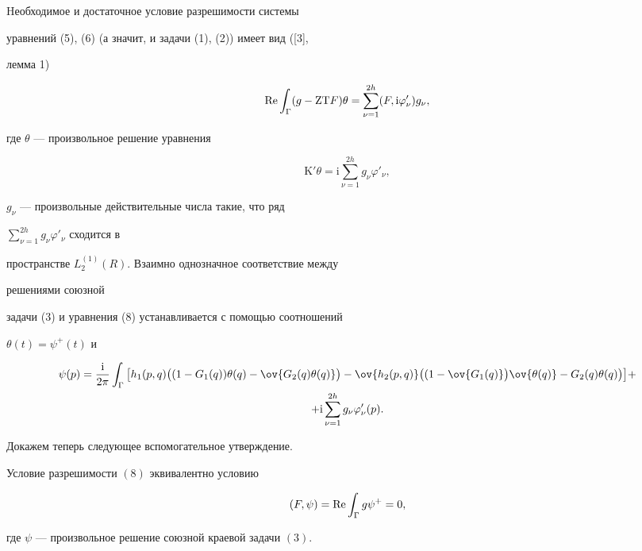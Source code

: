 Hеобходимое и достаточное условие разрешимости системы 


уравнений (5), (6) (а значит, и задачи (1), (2)) имеет вид ([3], 


лемма 1) 


\begin{equation} 


\re\int_\Gamma(g-{\mathrm Z}{\mathrm T}F)\theta= 


\sum^{2h}_{\nu=1}(F,{\mathrm i}\varphi'_\nu)g_\nu, 


\end{equation} 


где $\theta$ --- произвольное решение уравнения 


\begin{equation} 


{\mathrm K}'\theta={\mathrm i}\sum^{2h}_{\nu=1}g_\nu\varphi'_\nu, 


\end{equation} 


$g_\nu$ --- произвольные действительные числа такие, что ряд 


$\sum\limits^{2h}_{\nu=1}g_\nu\varphi'_\nu$ сходится в 


пространстве $L^{(1)}_2(R)$. Взаимно однозначное соответствие между 


решениями союзной 


задачи (3) и уравнения (8) устанавливается с помощью соотношений 


$\theta(t)=\psi^+(t)$ и 


\begin{multline*} 


\psi(p)=\frac{{\mathrm i}}{2\pi}\int_\Gamma\big[h_1(p,q)\big((1-G_1(q)) 


\theta(q)-\ov{G_2(q)\theta(q)}\big)-\ov{h_2(p,q)} 


\big((1-\ov{G_1(q)}\big)\ov{\theta(q)}-G_2(q)\theta(q)\big)\big]+ \\


+{\mathrm i}\sum^{2h}_{\nu=1}g_\nu\varphi'_\nu(p). 


\end{multline*}  


 


Докажем теперь следующее вспомогательное утверждение. 


 


\begin{lemnonum} 


Условие разрешимости $(8)$ эквивалентно условию 


\begin{equation} 


(F,\psi)=\re\int_\Gamma g\psi^+=0, 


\end{equation} 


где $\psi$ --- произвольное решение союзной краевой задачи $(3)$. 


\end{lemnonum} 


